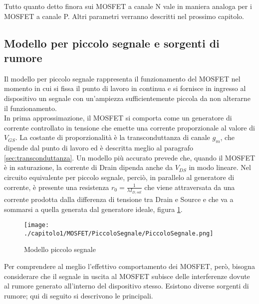 Tutto quanto detto finora sui MOSFET a canale N vale in maniera analoga per i MOSFET a canale P.
Altri parametri verranno descritti nel prossimo capitolo.

\subsection{Modello per piccolo segnale e sorgenti di rumore}
Il modello per piccolo segnale rappresenta il funzionamento del MOSFET nel momento in cui si fissa il punto di lavoro in continua e si fornisce in ingresso al dispositivo un segnale con un'ampiezza sufficientemente piccola da non alterarne il funzionamento. \\

In prima approssimazione, il MOSFET si comporta come un generatore di corrente controllato in tensione che emette una corrente proporzionale al valore di $V_{GS}$. La costante di proporzionalità è la transconduttanza di canale $g_m$, che dipende dal punto di lavoro ed è descritta meglio al paragrafo \ref{sec:transconduttanza}. Un modello più accurato prevede che, quando il MOSFET è in saturazione, la corrente di Drain dipenda anche da $V_{DS}$ in modo lineare. Nel circuito equivalente per piccolo segnale, perciò, in parallelo al generatore di corrente, è presente una resistenza $r_0 = \frac{1}{\lambda I_{D,sat}}$ che viene attraversata da una corrente prodotta dalla differenza di tensione tra Drain e Source e che va a sommarsi a quella generata dal generatore ideale, figura \ref{fig:piccolo_segnale}.

\begin{figure}[t]
  
  \centering
  \texttt{[image: ./capitolo1/MOSFET/PiccoloSegnale/PiccoloSegnale.png]}
  \caption[Modello piccolo segnale]{Modello piccolo segnale}
  \label{fig:piccolo_segnale}

\end{figure}

\vspace*{0.5cm}

Per comprendere al meglio l'effettivo comportamento dei MOSFET, però, bisogna considerare che il segnale in uscita al MOSFET subisce delle interferenze dovute al rumore generato all'interno del dispositivo stesso. Esistono diverse sorgenti di rumore; qui di seguito si descrivono le principali.

